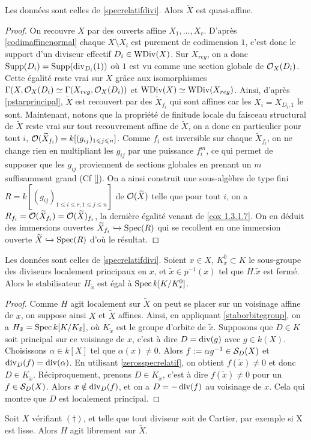 \begin{cor}
Les données sont celles de \ref{specrelatifdivi}. Alors $\widetilde{X}$ est quasi-affine.
\end{cor}
\begin{proof}
On recouvre $X$ par des ouverts affine $X_1,...,X_r$. D'après \ref{codimaffinenormal} chaque $X\setminus X_i$ est purement de codimension $1$, c'est donc le support d'un diviseur effectif $D_i\in \operatorname{WDiv}(X)$. Sur $X_{reg}$, on a donc $\operatorname{Supp}(D_i)=\operatorname{Supp}(\operatorname{div}_{D_i}(1))$ où $1$ est vu comme une section globale de $\mathcal{O}_X(D_i)$. Cette égalité reste vrai sur $X$ grâce aux isomorphismes $\Gamma(X ,\mathcal{O}_X(D_i)\simeq\Gamma(X_{reg} ,\mathcal{O}_X(D_i))$ et $\operatorname{WDiv}(X)\simeq\operatorname{WDiv}(X_{reg})$. Ainsi, d'après \ref{pstarprincipal}, $\widetilde{X}$ est recouvert par des $\widetilde{X}_{f_i}$ qui sont affines car les $X_i=X_{D_i,1}$ le sont. Maintenant, notons que la propriété de finitude locale du faisceau structural de $\widetilde{X}$ reste vrai sur tout recouvrement affine de $\widetilde{X}$, on a donc en particulier pour tout $i$, $\mathcal{O}(\widetilde{X}_{f_i})=k[(g_{ij})_{1\leqslant j\leqslant n}]$. Comme $f_i$ est inversible sur chaque $\widetilde{X}_{f_i}$, on ne change rien en multipliant les $g_{ij}$ par une puissance $f_i^m$, ce qui permet de supposer que les $g_{ij}$ proviennent de sections globales en prenant un $m$ suffisamment grand (Cf \ref{}). On a ainsi construit une sous-algèbre de type fini $R=k[(g_{ij})_{1\leq i\leq r, 1\leq j\leq n}]$ de $\mathcal{O}(\widetilde{X})$ telle que pour tout $i$, on a $R_{f_i}=\mathcal{O}({\widetilde{X}_{f_i}})=\mathcal{O}({\widetilde{X}})_{f_i}$, la dernière égalité venant de \ref{cox 1.3.1.7}. On en déduit des immersions ouvertes $\widetilde{X}_{f_i}\xhookrightarrow{} \operatorname{Spec}(R)$ qui se recollent en une immersion ouverte $\widetilde{X}\xhookrightarrow{} \operatorname{Spec}(R)$ d'où le résultat.
\end{proof}

\begin{cor}
Les données sont celles de \ref{specrelatifdivi}. Soient $x\in X$, $K_x^0\subset K$ le sous-groupe des diviseurs localement principaux en $x$, et $\tilde{x}\in p^{-1}(x)$ tel que $H.\tilde{x}$ est fermé. Alors le stabilisateur $H_{\tilde{x}}$ est égal à $\operatorname{Spec} k[K/K_x^0]$.
\end{cor}
\begin{proof}
Comme $H$ agit localement sur $\widetilde{X}$ on peut se placer sur un voisinage affine de $x$, on suppose ainsi $X$ et $\widetilde{X}$ affines. Ainsi, en appliquant \ref{staborbitegroup}, on a $H_{\tilde{x}}=\operatorname{Spec} k[K/K_{\tilde{x}}]$, où $K_{\tilde{x}}$ est le groupe d'orbite de $\tilde{x}$. Supposons que $D\in K$ soit principal sur ce voisinage de $x$, c'est à dire $D=\operatorname{div}(g)$ avec $g\in k(X)$. Choisissons $\alpha \in k[X]$ tel que $\alpha(x)\neq 0$. Alors $f:=\alpha g^{-1}\in \mathcal{S}_D(X)$ et $\operatorname{div}_D(f)=\operatorname{div}(\alpha)$. En utilisant \ref{zerosspecrelatif}, on obtient $f(\tilde{x})\neq 0$ et donc $D\in K_{\tilde{x}}$. Réciproquement, prenons $D\in K_{\tilde{x}}$, c'est à dire $f(\tilde{x})\neq 0$ pour un $f\in \mathcal{S}_D(X)$. Alors $x\notin \operatorname{div}_D(f)$, et on a $D=-\operatorname{div}(f)$ au voisinage de $x$. Cela qui montre que $D$ est localement principal.
\end{proof}

\begin{cor}
Soit $X$ vérifiant $(\dagger)$, et telle que tout diviseur soit de Cartier, par exemple si X est lisse. Alors $H$ agit librement sur $\widetilde{X}$.
\end{cor}

